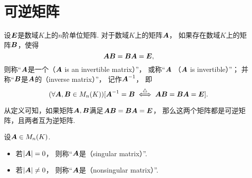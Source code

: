 \section{可逆矩阵}

\begin{definition}\label{definition:可逆矩阵.可逆矩阵的定义}
设\(\boldsymbol{E}\)是数域\(K\)上的\(n\)阶单位矩阵.
对于数域\(K\)上的矩阵\(\boldsymbol{A}\)，
如果存在数域\(K\)上的矩阵\(\boldsymbol{B}\)，使得\[
	\boldsymbol{A}\boldsymbol{B}=\boldsymbol{B}\boldsymbol{A}=\boldsymbol{E},
\]
则称“\(\boldsymbol{A}\)是一个（\(\boldsymbol{A}\) is an invertible matrix）”，
或称“\(\boldsymbol{A}\) （\(\boldsymbol{A}\) is invertible）”；
并称“\(\boldsymbol{B}\)是\(\boldsymbol{A}\)的（inverse matrix）”，
记作\(\boldsymbol{A}^{-1}\)，
即\[
	(\forall \boldsymbol{A},\boldsymbol{B}\in M_n(K))
	[\boldsymbol{A}^{-1} = \boldsymbol{B} \overset{\triangle}{\iff} \boldsymbol{A}\boldsymbol{B}=\boldsymbol{B}\boldsymbol{A}=\boldsymbol{E}].
\]
\end{definition}

从定义可知，如果矩阵\(\boldsymbol{A},\boldsymbol{B}\)满足\(\boldsymbol{A}\boldsymbol{B}=\boldsymbol{B}\boldsymbol{A}=\boldsymbol{E}\)，
那么这两个矩阵都是可逆矩阵，且两者互为逆矩阵.

\begin{definition}
设\(\boldsymbol{A} \in M_n(K)\).
\begin{itemize}
	\item 若\(\abs{\boldsymbol{A}}=0\)，
	则称“\(\boldsymbol{A}\)是（singular matrix）”.
	\item 若\(\abs{\boldsymbol{A}} \neq 0\)，
	则称“\(\boldsymbol{A}\)是（nonsingular matrix）”.
\end{itemize}
\end{definition}

